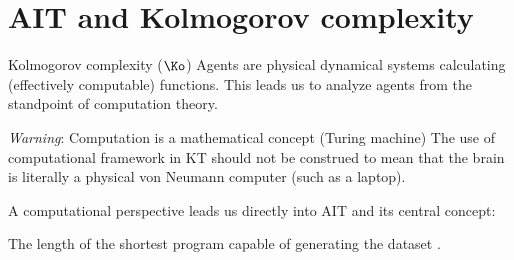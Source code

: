 \section{AIT and Kolmogorov complexity}
\begin{frame}[label=intro3]{Kolmogorov complexity ($\Ko$)}
 Agents are physical dynamical systems calculating (effectively computable) functions.   This leads us to analyze agents from the standpoint of computation theory.
 \begin{alertblock}{\textit{Warning}: Computation is a mathematical concept (Turing machine)}
The use of computational framework in KT should not be construed to mean that the brain is literally a physical von Neumann computer (such as a laptop).
\end{alertblock}\vfill 
 
A computational perspective  leads us directly into AIT and its central concept: 


\begin{definition}
The length of the shortest program capable of generating  the dataset \citep{Kolomgorov1965}.  
\end{definition}
\end{frame}





